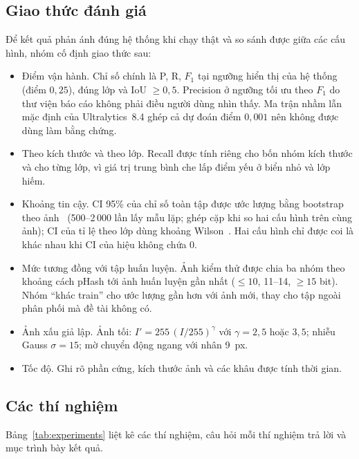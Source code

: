 \subsection{Giao thức đánh giá}
Để kết quả phản ánh đúng hệ thống khi chạy thật và so sánh được giữa các cấu hình, nhóm cố định giao thức sau:
\begin{itemize}
 \item Điểm vận hành. Chỉ số chính là P, R, $F_1$ tại ngưỡng hiển thị của hệ thống (điểm $0{,}25$), đúng lớp và IoU $\ge0{,}5$. Precision ở ngưỡng tối ưu theo $F_1$ do thư viện báo cáo không phải điều người dùng nhìn thấy. Ma trận nhầm lẫn mặc định của Ultralytics~8.4 ghép cả dự đoán điểm $0{,}001$ nên không được dùng làm bằng chứng.
 \item Theo kích thước và theo lớp. Recall được tính riêng cho bốn nhóm kích thước và cho từng lớp, vì giá trị trung bình che lấp điểm yếu ở biển nhỏ và lớp hiếm.
 \item Khoảng tin cậy. CI 95\% của chỉ số toàn tập được ước lượng bằng bootstrap theo ảnh~\cite{efron1993bootstrap} (500--2\,000 lần lấy mẫu lặp; ghép cặp khi so hai cấu hình trên cùng ảnh); CI của tỉ lệ theo lớp dùng khoảng Wilson~\cite{wilson1927}. Hai cấu hình chỉ được coi là khác nhau khi CI của hiệu không chứa 0.
 \item Mức tương đồng với tập huấn luyện. Ảnh kiểm thử được chia ba nhóm theo khoảng cách pHash tới ảnh huấn luyện gần nhất ($\le10$, 11--14, $\ge15$ bit). Nhóm ``khác train'' cho ước lượng gần hơn với ảnh mới, thay cho tập ngoài phân phối mà đề tài không có.
 \item Ảnh xấu giả lập. Ảnh tối: $I'=255\,(I/255)^{\gamma}$ với $\gamma=2{,}5$ hoặc $3{,}5$; nhiễu Gauss $\sigma=15$; mờ chuyển động ngang với nhân 9~px.
 \item Tốc độ. Ghi rõ phần cứng, kích thước ảnh và các khâu được tính thời gian.
\end{itemize}

\subsection{Các thí nghiệm}
Bảng~\ref{tab:experiments} liệt kê các thí nghiệm, câu hỏi mỗi thí nghiệm trả lời và mục trình bày kết quả.

